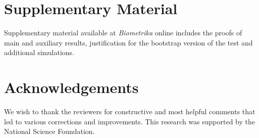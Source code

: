 \documentclass[lineno]{biometrika}
\def\references{}
\newcommand{\ed}{\end{document}}
\begin{document}
\section*{Supplementary Material}
Supplementary material available at {\it Biometrika} online includes the proofs of main and auxiliary results, justification for the bootstrap version of the test and additional simulations. 

\section*{Acknowledgements}
We wish to thank the reviewers for constructive and most helpful comments that led to various corrections and improvements. This research was supported by the National Science Foundation. 


\references
\ed
\end{document}
